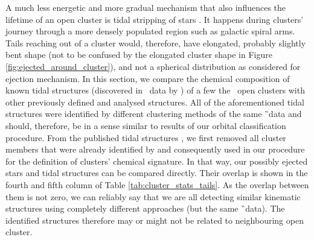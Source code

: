 A much less energetic and more gradual mechanism that also influences the lifetime of an open cluster is tidal stripping of stars \cite{2006A&A...455L..17L}. It happens during clusters' journey through a more densely populated region such as galactic spiral arms. Tails reaching out of a cluster would, therefore, have elongated, probably slightly bent shape (not to be confused by the elongated cluster shape in Figure \ref{fig:ejected_around_cluster}), and not a spherical distribution as considered for ejection mechanism. In this section, we compare the chemical composition of known tidal structures (discovered in \Gs\ data by \citet{2019AA...627A...4R, 2019AA...627A.119C, 2019AA...621L...3M, 2019arXiv191206657Z}) of a few the \Gh\ open clusters with other previously defined and analysed structures. All of the aforementioned tidal structures were identified by different clustering methods of the same \G\ data and should, therefore, be in a sense similar to results of our orbital classification procedure. From the published tidal structures \cite{2019AA...627A...4R, 2019AA...627A.119C, 2019AA...621L...3M, 2019arXiv191206657Z}, we first removed all cluster members that were already identified by \citet{2018A&A...618A..93C} and consequently used in our procedure for the definition of clusters' chemical signature. In that way, our possibly ejected stars and tidal structures can be compared directly. Their overlap is shown in the fourth and fifth column of Table \ref{tab:cluster_stats_tails}. As the overlap between them is not zero, we can reliably say that we are all detecting similar kinematic structures using completely different approaches (but the same \G\ data). The identified structures therefore may or might not be related to neighbouring open cluster.

